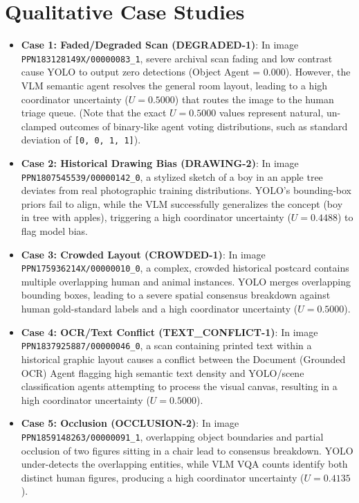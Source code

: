 \documentclass[11pt,a4paper]{article}
\newcommand{\term}[1]{\textbf{#1}}
\begin{document}
\section{Qualitative Case Studies}
\begin{itemize}[leftmargin=*]
    \item \term{Case 1: Faded/Degraded Scan (DEGRADED-1)}: In image \texttt{PPN183128149X/00000083\_1}, severe archival scan fading and low contrast cause YOLO to output zero detections (Object Agent = 0.000). However, the VLM semantic agent resolves the general room layout, leading to a high coordinator uncertainty ($U = 0.5000$) that routes the image to the human triage queue. (Note that the exact $U = 0.5000$ values represent natural, un-clamped outcomes of binary-like agent voting distributions, such as standard deviation of \texttt{[0, 0, 1, 1]}).
    \item \term{Case 2: Historical Drawing Bias (DRAWING-2)}: In image \texttt{PPN1807545539/00000142\_0}, a stylized sketch of a boy in an apple tree deviates from real photographic training distributions. YOLO's bounding-box priors fail to align, while the VLM successfully generalizes the concept (boy in tree with apples), triggering a high coordinator uncertainty ($U = 0.4488$) to flag model bias.
    \item \term{Case 3: Crowded Layout (CROWDED-1)}: In image \texttt{PPN175936214X/00000010\_0}, a complex, crowded historical postcard contains multiple overlapping human and animal instances. YOLO merges overlapping bounding boxes, leading to a severe spatial consensus breakdown against human gold-standard labels and a high coordinator uncertainty ($U = 0.5000$).
    \item \term{Case 4: OCR/Text Conflict (TEXT\_CONFLICT-1)}: In image \texttt{PPN1837925887/00000046\_0}, a scan containing printed text within a historical graphic layout causes a conflict between the Document (Grounded OCR) Agent flagging high semantic text density and YOLO/scene classification agents attempting to process the visual canvas, resulting in a high coordinator uncertainty ($U = 0.5000$).
    \item \term{Case 5: Occlusion (OCCLUSION-2)}: In image \texttt{PPN1859148263/00000091\_1}, overlapping object boundaries and partial occlusion of two figures sitting in a chair lead to consensus breakdown. YOLO under-detects the overlapping entities, while VLM VQA counts identify both distinct human figures, producing a high coordinator uncertainty ($U = 0.4135$).
\end{itemize}
\end{document}

